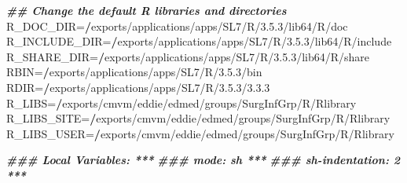 \documentclass[
]{book}
\newenvironment{Shaded}{\begin{snugshade}}{\end{snugshade}}
\newcommand{\DecValTok}[1]{\textcolor[rgb]{0.00,0.00,0.81}{#1}}
\newcommand{\DocumentationTok}[1]{\textcolor[rgb]{0.56,0.35,0.01}{\textbf{\textit{#1}}}}
\newcommand{\ErrorTok}[1]{\textcolor[rgb]{0.64,0.00,0.00}{\textbf{#1}}}
\newcommand{\FloatTok}[1]{\textcolor[rgb]{0.00,0.00,0.81}{#1}}
\newcommand{\NormalTok}[1]{#1}
\newcommand{\OtherTok}[1]{\textcolor[rgb]{0.56,0.35,0.01}{#1}}
\newcommand{\SpecialCharTok}[1]{\textcolor[rgb]{0.00,0.00,0.00}{#1}}
\begin{document}
\begin{Shaded}
\begin{Highlighting}[]
\DocumentationTok{\#\# Change the default R libraries and directories}
\NormalTok{R\_DOC\_DIR}\OtherTok{=}\ErrorTok{/}\NormalTok{exports}\SpecialCharTok{/}\NormalTok{applications}\SpecialCharTok{/}\NormalTok{apps}\SpecialCharTok{/}\NormalTok{SL7}\SpecialCharTok{/}\NormalTok{R}\SpecialCharTok{/}\DecValTok{3}\NormalTok{.}\FloatTok{5.3}\SpecialCharTok{/}\NormalTok{lib64}\SpecialCharTok{/}\NormalTok{R}\SpecialCharTok{/}\NormalTok{doc}
\NormalTok{R\_INCLUDE\_DIR}\OtherTok{=}\ErrorTok{/}\NormalTok{exports}\SpecialCharTok{/}\NormalTok{applications}\SpecialCharTok{/}\NormalTok{apps}\SpecialCharTok{/}\NormalTok{SL7}\SpecialCharTok{/}\NormalTok{R}\SpecialCharTok{/}\DecValTok{3}\NormalTok{.}\FloatTok{5.3}\SpecialCharTok{/}\NormalTok{lib64}\SpecialCharTok{/}\NormalTok{R}\SpecialCharTok{/}\NormalTok{include}
\NormalTok{R\_SHARE\_DIR}\OtherTok{=}\ErrorTok{/}\NormalTok{exports}\SpecialCharTok{/}\NormalTok{applications}\SpecialCharTok{/}\NormalTok{apps}\SpecialCharTok{/}\NormalTok{SL7}\SpecialCharTok{/}\NormalTok{R}\SpecialCharTok{/}\DecValTok{3}\NormalTok{.}\FloatTok{5.3}\SpecialCharTok{/}\NormalTok{lib64}\SpecialCharTok{/}\NormalTok{R}\SpecialCharTok{/}\NormalTok{share}
\NormalTok{RBIN}\OtherTok{=}\ErrorTok{/}\NormalTok{exports}\SpecialCharTok{/}\NormalTok{applications}\SpecialCharTok{/}\NormalTok{apps}\SpecialCharTok{/}\NormalTok{SL7}\SpecialCharTok{/}\NormalTok{R}\SpecialCharTok{/}\DecValTok{3}\NormalTok{.}\FloatTok{5.3}\SpecialCharTok{/}\NormalTok{bin}
\NormalTok{RDIR}\OtherTok{=}\ErrorTok{/}\NormalTok{exports}\SpecialCharTok{/}\NormalTok{applications}\SpecialCharTok{/}\NormalTok{apps}\SpecialCharTok{/}\NormalTok{SL7}\SpecialCharTok{/}\NormalTok{R}\SpecialCharTok{/}\DecValTok{3}\NormalTok{.}\FloatTok{5.3}\SpecialCharTok{/}\DecValTok{3}\NormalTok{.}\FloatTok{3.3}
\NormalTok{R\_LIBS}\OtherTok{=}\ErrorTok{/}\NormalTok{exports}\SpecialCharTok{/}\NormalTok{cmvm}\SpecialCharTok{/}\NormalTok{eddie}\SpecialCharTok{/}\NormalTok{edmed}\SpecialCharTok{/}\NormalTok{groups}\SpecialCharTok{/}\NormalTok{SurgInfGrp}\SpecialCharTok{/}\NormalTok{R}\SpecialCharTok{/}\NormalTok{Rlibrary}
\NormalTok{R\_LIBS\_SITE}\OtherTok{=}\ErrorTok{/}\NormalTok{exports}\SpecialCharTok{/}\NormalTok{cmvm}\SpecialCharTok{/}\NormalTok{eddie}\SpecialCharTok{/}\NormalTok{edmed}\SpecialCharTok{/}\NormalTok{groups}\SpecialCharTok{/}\NormalTok{SurgInfGrp}\SpecialCharTok{/}\NormalTok{R}\SpecialCharTok{/}\NormalTok{Rlibrary}
\NormalTok{R\_LIBS\_USER}\OtherTok{=}\ErrorTok{/}\NormalTok{exports}\SpecialCharTok{/}\NormalTok{cmvm}\SpecialCharTok{/}\NormalTok{eddie}\SpecialCharTok{/}\NormalTok{edmed}\SpecialCharTok{/}\NormalTok{groups}\SpecialCharTok{/}\NormalTok{SurgInfGrp}\SpecialCharTok{/}\NormalTok{R}\SpecialCharTok{/}\NormalTok{Rlibrary}




\DocumentationTok{\#\#\# Local Variables: ***}
\DocumentationTok{\#\#\# mode: sh ***}
\DocumentationTok{\#\#\# sh{-}indentation: 2 ***}
\end{Highlighting}
\end{Shaded}
\end{document}
